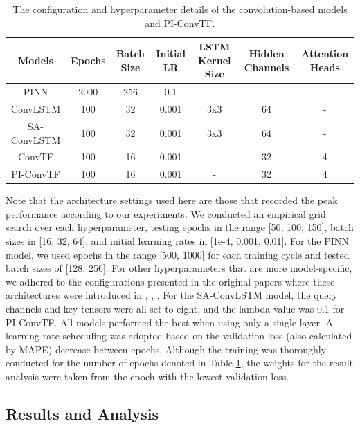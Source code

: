 \documentclass{article}
\begin{document}
\begin{table}[htp]
    \centering
    \begin{tabular}{|c c c c c c c|}
         \hline
         Models & Epochs & Batch Size & Initial LR & LSTM Kernel Size & Hidden Channels & Attention Heads \\ 
         \hline\hline
         PINN & 2000 & 256 & 0.1 & - & - & - \\
         \hline
         ConvLSTM & 100 & 32 & 0.001 & 3x3 & 64 & - \\
         \hline
         SA-ConvLSTM & 100 & 32 & 0.001 & 3x3 & 64 & - \\
         \hline
         ConvTF & 100 & 16 & 0.001 & - & 32 & 4 \\
         \hline
         PI-ConvTF & 100 & 16 & 0.001 & - & 32 & 4 \\
         \hline
    \end{tabular}
    \captionsetup{skip=10pt}
    \caption{The configuration and hyperparameter details of the convolution-based models and PI-ConvTF.}
    \label{table:1}
\end{table}

Note that the architecture settings used here are those that recorded the peak performance according to our experiments. We conducted an empirical grid search over each hyperparameter, testing epochs in the range [50, 100, 150], batch sizes in [16, 32, 64], and initial learning rates in [1e-4, 0.001, 0.01]. For the PINN model, we used epochs in the range [500, 1000] for each training cycle and tested batch sizes of [128, 256]. For other hyperparameters that are more model-specific, we adhered to the configurations presented in the original papers where these architectures were introduced in \citep{shi2015convolutional}, \citep{lin2020selfattention}, \citep{liu2021convtransformer}. For the SA-ConvLSTM model, the query channels and key tensors were all set to eight, and the lambda value was 0.1 for PI-ConvTF. All models performed the best when using only a single layer. A learning rate scheduling was adopted based on the validation loss (also calculated by MAPE) decrease between epochs. Although the training was thoroughly conducted for the number of epochs denoted in Table \ref{table:1}, the weights for the result analysis were taken from the epoch with the lowest validation loss.

\subsection{Results and Analysis} \label{experiments}
\end{document}
